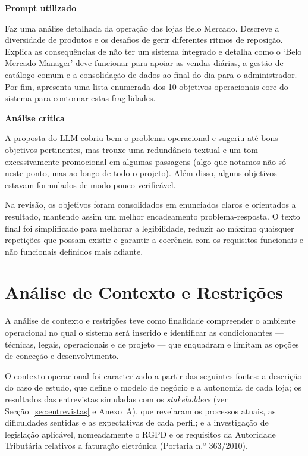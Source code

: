     \begin{tcolorbox}[title=Interação com o LLM]
    \textbf{Prompt utilizado}

    Faz uma análise detalhada da operação das lojas Belo Mercado. Descreve a diversidade de produtos e os desafios de gerir diferentes ritmos de reposição. Explica as consequências de não ter um sistema integrado e detalha como o `Belo Mercado Manager' deve funcionar para apoiar as vendas diárias, a gestão de catálogo comum e a consolidação de dados ao final do dia para o administrador. Por fim, apresenta uma lista enumerada dos 10 objetivos operacionais core do sistema para contornar estas fragilidades.

    \tcblower

    \textbf{Análise crítica}

    A proposta do LLM cobriu bem o problema operacional e sugeriu até bons objetivos pertinentes, mas trouxe uma redundância textual e um tom excessivamente promocional em algumas passagens (algo que notamos não só neste ponto, mas ao longo de todo o projeto). Além disso, alguns objetivos estavam formulados de modo pouco verificável.

    Na revisão, os objetivos foram consolidados em enunciados claros e orientados a resultado, mantendo assim um melhor encadeamento problema-resposta. O texto final foi simplificado para melhorar a legibilidade, reduzir ao máximo quaisquer repetições que possam existir e garantir a coerência com os requisitos funcionais e não funcionais definidos mais adiante.
    \end{tcolorbox}

\section{Análise de Contexto e Restrições}

    A análise de contexto e restrições teve como finalidade compreender o ambiente operacional no qual o sistema será inserido e identificar as condicionantes --- técnicas, legais, operacionais e de projeto --- que enquadram e limitam as opções de conceção e desenvolvimento.

    O contexto operacional foi caracterizado a partir das seguintes fontes: a descrição do caso de estudo, que define o modelo de negócio e a autonomia de cada loja; os resultados das entrevistas simuladas com os \textit{stakeholders} (ver Secção~\ref{sec:entrevistas} e Anexo~A), que revelaram os processos atuais, as dificuldades sentidas e as expectativas de cada perfil; e a investigação de legislação aplicável, nomeadamente o RGPD e os requisitos da Autoridade Tributária relativos a faturação eletrónica (Portaria n.º 363/2010).

